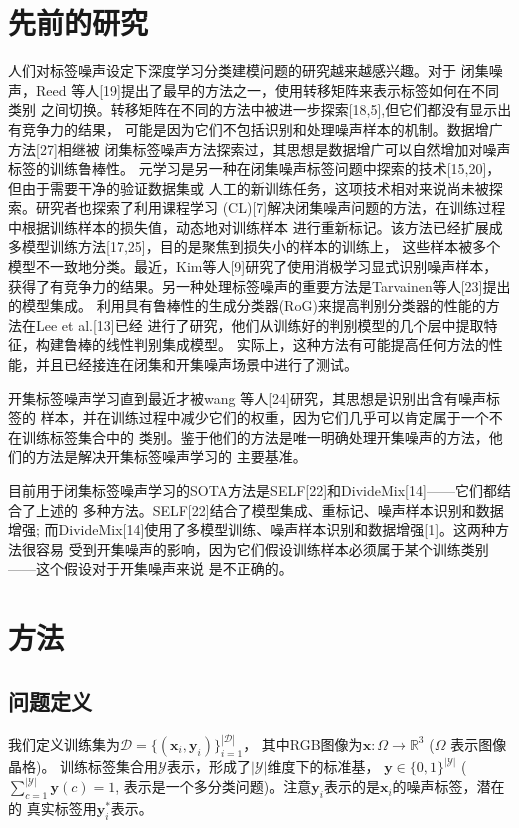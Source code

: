\documentclass[11pt]{article}
\begin{document}
\section{先前的研究}
人们对标签噪声设定下深度学习分类建模问题的研究越来越感兴趣。对于
闭集噪声，Reed 等人[19]提出了最早的方法之一，使用转移矩阵来表示标签如何在不同类别
之间切换。转移矩阵在不同的方法中被进一步探索[18,5],但它们都没有显示出有竞争力的结果，
可能是因为它们不包括识别和处理噪声样本的机制。数据增广方法[27]相继被
闭集标签噪声方法探索过，其思想是数据增广可以自然增加对噪声标签的训练鲁棒性。
元学习是另一种在闭集噪声标签问题中探索的技术[15,20]，但由于需要干净的验证数据集或
人工的新训练任务，这项技术相对来说尚未被探索。研究者也探索了利用课程学习
(CL)[7]解决闭集噪声问题的方法，在训练过程中根据训练样本的损失值，动态地对训练样本
进行重新标记。该方法已经扩展成多模型训练方法[17,25]，目的是聚焦到损失小的样本的训练上，
这些样本被多个模型不一致地分类。最近，Kim等人[9]研究了使用消极学习显式识别噪声样本，
获得了有竞争力的结果。另一种处理标签噪声的重要方法是Tarvainen等人[23]提出的模型集成。
利用具有鲁棒性的生成分类器(RoG)来提高判别分类器的性能的方法在Lee et al.[13]已经
进行了研究，他们从训练好的判别模型的几个层中提取特征，构建鲁棒的线性判别集成模型。
实际上，这种方法有可能提高任何方法的性能，并且已经接连在闭集和开集噪声场景中进行了测试。

开集标签噪声学习直到最近才被wang 等人[24]研究，其思想是识别出含有噪声标签的
样本，并在训练过程中减少它们的权重，因为它们几乎可以肯定属于一个不在训练标签集合中的
类别。鉴于他们的方法是唯一明确处理开集噪声的方法，他们的方法是解决开集标签噪声学习的
主要基准。

目前用于闭集标签噪声学习的SOTA方法是SELF[22]和DivideMix[14]——它们都结合了上述的
多种方法。SELF[22]结合了模型集成、重标记、噪声样本识别和数据增强;
而DivideMix[14]使用了多模型训练、噪声样本识别和数据增强[1]。这两种方法很容易
受到开集噪声的影响，因为它们假设训练样本必须属于某个训练类别——这个假设对于开集噪声来说
是不正确的。
\section{方法}
\subsection{问题定义}
我们定义训练集为$\mathcal{D}=\{(\mathbf{x}_i,\mathbf{y}_i)\}_{i=1}^{|\mathcal{D}|}$，
其中RGB图像为$\mathbf{x}:\Omega \rightarrow \mathbb{R}^3$ ($\Omega$ 表示图像晶格)。
训练标签集合用$\mathcal{Y}$表示，形成了$|\mathcal{Y}|$维度下的标准基，
$\mathbf{y} \in \{0,1\}^{|\mathcal{Y}|}$ ($\sum_{c=1}^{|\mathcal{Y}|}\mathbf{y}(c)=1$,
表示是一个多分类问题)。注意$\mathbf{y}_i$表示的是$\mathbf{x}_i$的噪声标签，潜在的
真实标签用$\mathbf{y}^{*}_i$表示。
\end{document}
